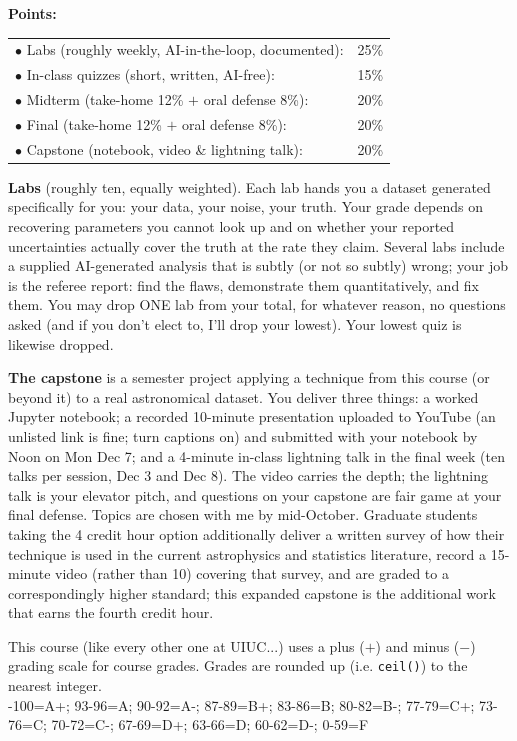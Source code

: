 {\bf \headerfont \color{RoyalBlue} Points:}
\begin{tabular}{ll}
$\bullet$ Labs (roughly weekly, AI-in-the-loop, documented): & 25\% \\
$\bullet$ In-class quizzes (short, written, AI-free): & 15\% \\
$\bullet$ Midterm (take-home 12\% $+$ oral defense 8\%): & 20\% \\
$\bullet$ Final (take-home 12\% $+$ oral defense 8\%): & 20\% \\
$\bullet$ Capstone (notebook, video \& lightning talk): & 20\% \\
\end{tabular}

{\bf Labs} (roughly ten, equally weighted). Each lab hands you a dataset generated specifically for you: your data, your
noise, your truth. Your grade depends on recovering parameters you cannot
look up and on whether your reported uncertainties actually cover the truth at
the rate they claim. Several labs include a supplied AI-generated analysis
that is subtly (or not so subtly) wrong; your job is the referee report:
find the flaws, demonstrate them quantitatively, and fix them. You may drop
ONE lab from your total, for whatever reason, no questions asked (and if you
don't elect to, I'll drop your lowest). Your lowest quiz is likewise dropped.

{\bf The capstone} is a semester project applying a technique from this course
(or beyond it) to a real astronomical dataset. You deliver three things: a
worked Jupyter notebook; a recorded 10-minute presentation uploaded to YouTube
(an unlisted link is fine; turn captions on) and submitted with your notebook
by Noon on Mon Dec 7; and a 4-minute in-class lightning talk in the final week
(ten talks per session, Dec 3 and Dec 8). The video carries the depth; the
lightning talk is your elevator pitch, and questions on your capstone are fair
game at your final defense. Topics are chosen with me by mid-October. Graduate students taking the 4 credit hour
option additionally deliver a written survey of how their technique is used in
the current astrophysics and statistics literature, record a 15-minute video
(rather than 10) covering that survey, and are graded to a correspondingly
higher standard; this expanded capstone is the additional work that earns the
fourth credit hour.

This course (like every other one at UIUC...) uses a plus ($+$) and minus
($-$) grading scale for course grades.
Grades are rounded up (i.e. \texttt{ceil()}) to the nearest integer.\\
-100=A+; 93-96=A; 90-92=A-; 87-89=B+; 83-86=B; 80-82=B-; 77-79=C+; 73-76=C; 70-72=C-;
67-69=D+; 63-66=D; 60-62=D-; 0-59=F
\medskip

